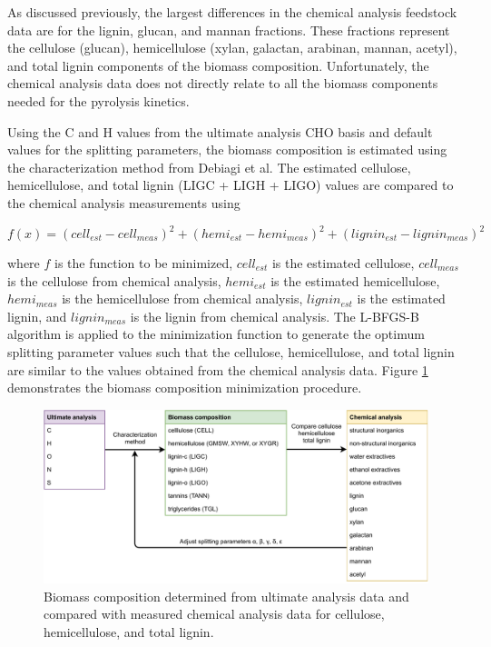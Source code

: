 As discussed previously, the largest differences in the chemical analysis feedstock data are for the lignin, glucan, and mannan fractions. These fractions represent the cellulose (glucan), hemicellulose (xylan, galactan, arabinan, mannan, acetyl), and total lignin components of the biomass composition. Unfortunately, the chemical analysis data does not directly relate to all the biomass components needed for the pyrolysis kinetics.

Using the C and H values from the ultimate analysis CHO basis and default values for the splitting parameters, the biomass composition is estimated using the characterization method from Debiagi et al. The estimated cellulose, hemicellulose, and total lignin (LIGC + LIGH + LIGO) values are compared to the chemical analysis measurements using

\begin{equation}
    f(x) = (cell_{est} - cell_{meas})^2 + (hemi_{est} - hemi_{meas})^2 + (lignin_{est} - lignin_{meas})^2
\end{equation}

\noindent where $f$ is the function to be minimized, $cell_{est}$ is the estimated cellulose, $cell_{meas}$ is the cellulose from chemical analysis, $hemi_{est}$ is the estimated hemicellulose, $hemi_{meas}$ is the hemicellulose from chemical analysis, $lignin_{est}$ is the estimated lignin, and $lignin_{meas}$ is the lignin from chemical analysis. The L-BFGS-B algorithm is applied to the minimization function to generate the optimum splitting parameter values such that the cellulose, hemicellulose, and total lignin are similar to the values obtained from the chemical analysis data. Figure \ref{fig:biocomp2} demonstrates the biomass composition minimization procedure.

\begin{figure}[H]
    \centering
    \includegraphics[width=\textwidth]{figures/biocomp2.pdf}
    \caption{Biomass composition determined from ultimate analysis data and compared with measured chemical analysis data for cellulose, hemicellulose, and total lignin.}
    \label{fig:biocomp2}
\end{figure}

